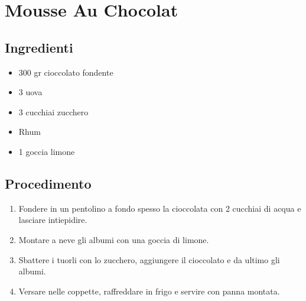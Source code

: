 \section{Mousse Au Chocolat}
\subsection{Ingredienti}
\begin{itemize}
\item 300 gr cioccolato fondente  
\item 3 uova  
\item 3 cucchiai zucchero  
\item Rhum  
\item 1 goccia limone
\end{itemize}
\subsection{Procedimento}
\begin{enumerate}
\item  Fondere in un pentolino a fondo spesso la cioccolata con 2 cucchiai di acqua e lasciare intiepidire.  
\item  Montare a neve gli albumi con una goccia di limone.  
\item  Sbattere i tuorli con lo zucchero, aggiungere il cioccolato e da ultimo gli albumi.   
\item  Versare nelle coppette, raffreddare in frigo e servire con panna montata.
\end{enumerate}

